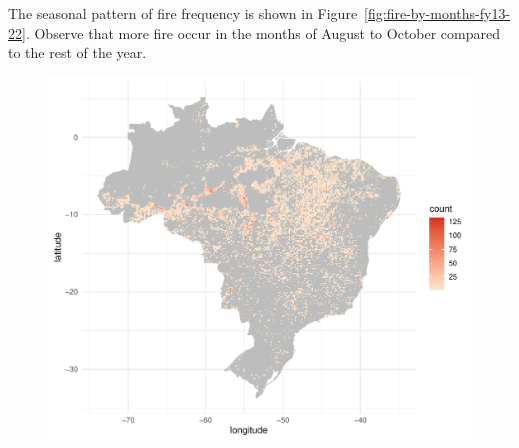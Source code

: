 \documentclass{article}\usepackage[]{graphicx}\usepackage[]{xcolor}
\makeatletter
\def\maxwidth{ %
  \ifdim\Gin@nat@width>\linewidth
    \linewidth
  \else
    \Gin@nat@width
  \fi
}
\newenvironment{knitrout}{}{} %
\makeatother
\begin{document}
\noindent
The seasonal pattern of fire frequency is shown in Figure~\ref{fig:fire-by-months-fy13-22}. Observe that more fire occur in the months of August to October compared to the rest of the year.









\begin{figure}[htbp]
  \centering
  \begin{minipage}[b]{0.48\linewidth}
\begin{knitrout}\scriptsize
{}\color{fgcolor}

{\centering \includegraphics[width=\maxwidth]{figure/beamer-spacetime-fy22-1} 

}



\end{knitrout}
\end{minipage}
\end{figure}
\end{document}
